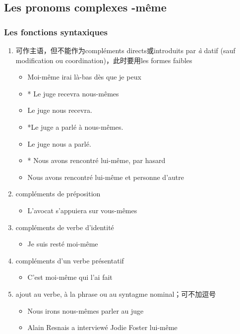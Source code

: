 \documentclass[UTF8]{report}
\begin{document}
\subsection{Les pronoms complexes -même}

\subsubsection{Les fonctions syntaxiques}
\begin{enumerate}
    \item 可作主语，但不能作为compléments directs或introduits par \emph{à} datif (sauf modification ou coordination)，此时要用les formes faibles
    \begin{itemize}
        \item Moi-même irai là-bas dès que je peux
        \item * Le juge recevra nous-mêmes
        \item Le juge nous recevra.
        \item *Le juge a parlé à nous-mêmes.
        \item Le juge nous a parlé.
        \item * Nous avons rencontré lui-même, par hasard
        \item  Nous avons rencontré lui-même et personne d’autre
    \end{itemize}
    \item compléments de préposition
    \begin{itemize}
        \item L’avocat s’appuiera sur vous-mêmes
    \end{itemize}
    \item compléments de verbe d’identité
    \begin{itemize}
        \item Je suis resté moi-même
    \end{itemize}
    \item compléments d’un verbe présentatif
    \begin{itemize}
        \item C’est moi-même qui l’ai fait
    \end{itemize}
    \item ajout au verbe, à la phrase ou au syntagme nominal；可不加逗号
    \begin{itemize}
        \item Nous irons nous-mêmes parler au juge
        \item Alain Resnais a interviewé Jodie Foster lui-même

\end{itemize}
\end{enumerate}
\end{document}
